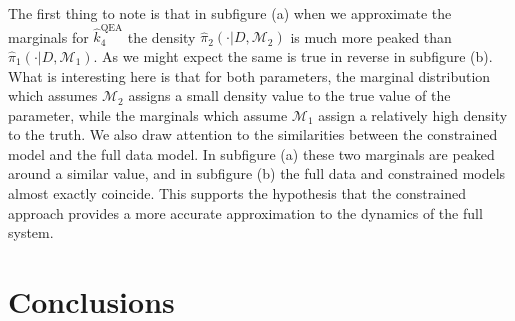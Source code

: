 \documentclass[final]{siamltex}
\begin{document}
The first thing to note is that in subfigure (a) when we approximate the marginals for $\hat{k}_4^{\text{QEA}}$ the density $\hat{\pi}_2(\cdot|D,\mathcal{M}_2)$ is much more peaked than $\hat{\pi}_1(\cdot|D,\mathcal{M}_1)$. As we might expect the same is true in reverse in subfigure (b). What is interesting here is that for both parameters, the marginal distribution which assumes $\mathcal{M}_2$ assigns a small density value to the true value of the parameter, while the marginals which assume $\mathcal{M}_1$ assign a relatively high density to the truth. We also draw attention to the similarities between the constrained model and the full data model. In subfigure (a) these two marginals are peaked around a similar value, and in subfigure (b) the full data and constrained models almost exactly coincide. This supports the hypothesis that the constrained approach provides a more accurate approximation to the dynamics of the full system.

\section{Conclusions}\label{sec:conc}



\end{document}
